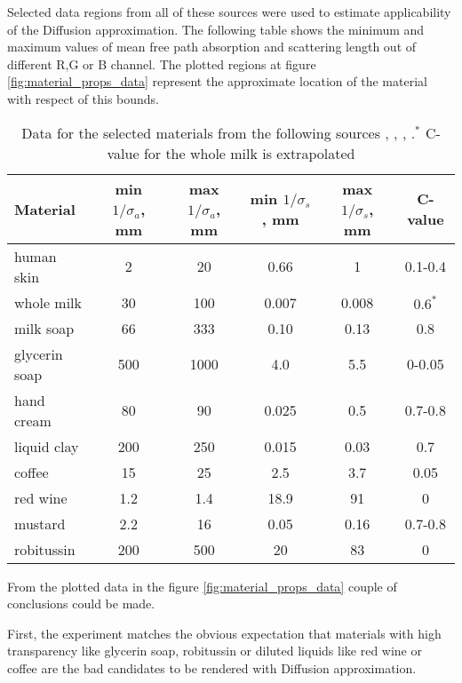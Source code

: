 Selected data regions from all of these sources were used to estimate applicability of the Diffusion
approximation. The following table shows the minimum and maximum values of mean free path absorption
and scattering length out of different R,G or B channel. The plotted regions at figure
\ref{fig:material_props_data} represent the approximate location of the material with respect of
this bounds.
\begin{table}[h]
\begin{tabu} to 0.6\textwidth { |l |c|c|c|c| c| }
    \hline
    Material & min $1/\sigma_a$, mm & max $1/\sigma_a$, mm & min $1/\sigma_s$, mm & max
    $1/\sigma_s$, mm & C-value \\ \hline
    \hline
    human skin & 2 & 20 & 0.66 & 1 & 0.1-0.4 \\ \hline
    whole milk & 30 & 100 & 0.007 & 0.008 & $0.6^*$ \\ \hline
    milk soap & 66 & 333 & 0.10 & 0.13 & 0.8 \\ \hline
    glycerin soap & 500 & 1000 & 4.0 & 5.5 & 0-0.05 \\ \hline
    hand cream & 80 & 90 & 0.025 & 0.5 & 0.7-0.8 \\ \hline
    liquid clay & 200 & 250 & 0.015 & 0.03 & 0.7 \\ \hline
    coffee & 15 & 25 & 2.5 & 3.7 & 0.05 \\ \hline
    red wine & 1.2 & 1.4 & 18.9 & 91 & 0 \\ \hline
    mustard & 2.2 & 16 & 0.05 & 0.16 & 0.7-0.8 \\ \hline
    robitussin & 200 & 500 & 20 & 83 & 0 \\ \hline
\end{tabu}
\caption{Data for the selected materials from the following sources
\cite{Jensen:2001:PMS:383259.383319}, \cite{tariq_efficient_2006-1}, \cite{Narasimhan:2006:ASP:1141911.1141986},
\cite{Gkioulekas:2013:IVR:2508363.2508377}.\newline $^*$ C-value for the whole milk is extrapolated}
\label{table:material_data}
\end{table}

From the plotted data in the figure \ref{fig:material_props_data} couple of conclusions could be
made.

First, the experiment matches the obvious expectation that materials with high transparency
like glycerin soap, robitussin or diluted liquids like red wine or coffee are the bad candidates to
be rendered with Diffusion approximation.

